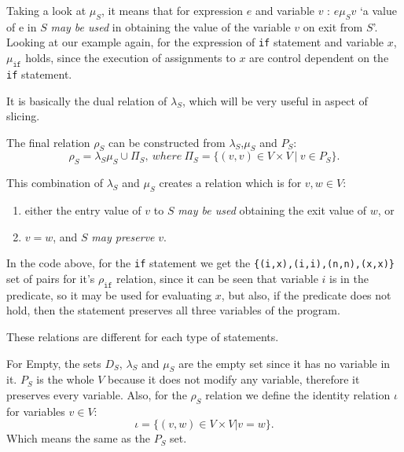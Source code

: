 \documentclass[oneside,12pt,a4paper]{book}
\begin{document}
Taking a look at $\mu_S$, it means that for expression $e$ and variable $v$ : $e \mu_S v$ `a value of e in $S$ \textit{may be used} in obtaining the value of the variable $v$ on exit from $S$'. Looking at our example again, for the expression of \texttt{if} statement and variable $x$, $\mu_{\texttt{if}}$ holds, since the execution of assignments to $x$ are control dependent on the \texttt{if} statement.

It is basically the dual relation of $\lambda_S$, which will be very useful in aspect of slicing.

The final relation $\rho_S$ can be constructed from $\lambda_S$,$\mu_S$ and $P_S$:
\begin{equation}
\rho_S = \lambda_S\mu_S \cup \Pi_S,\  where \ \Pi_S = \{(v,v) \in V \times V\ |\ v \in P_S\}.
\end{equation}

This combination of $\lambda_S$ and $\mu_S$ creates a relation which is for $v,w \in V$:
\begin{enumerate}
\item either the entry value of $v$ to $S$ \textit{may be used} obtaining the exit value of $w$, or
\item $v = w$, and $S$ \textit{may preserve} $v$.
\end{enumerate}

In the code above, for the \texttt{if} statement we get the \texttt{\{(i,x),(i,i),(n,n),(x,x)\}} set of pairs for it's $\rho_{\texttt{if}}$ relation, since it can be seen that variable $i$ is in the predicate, so it may be used for evaluating $x$, but also, if the predicate does not hold, then the statement preserves all three variables of the program. 

These relations are different for each type of statements.

For Empty, the sets $D_S$, $\lambda_S$ and $\mu_S$ are the empty set since it has no variable in it. $P_S$ is the whole $V$ because it does not modify any variable, therefore it preserves every variable. Also, for the $\rho_S$ relation we define the identity relation $\iota$ for variables $v \in V$:
\begin{equation}
\iota = \{(v,w) \in V \times V | v = w\}.
\end{equation}
Which means the same as the $P_S$ set.
\end{document}
